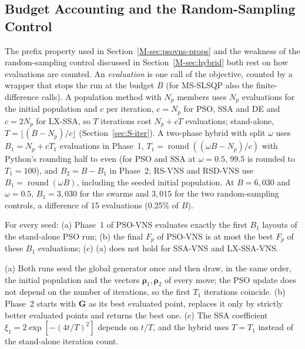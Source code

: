 \subsection{Budget Accounting and the Random-Sampling Control}
\label{sec:S-th-budget}
The prefix property used in Section~\ref{M-sec:psovns-props} and the weakness of the random-sampling control discussed in Section~\ref{M-sec:hybrid} both rest on how evaluations are counted. An \emph{evaluation} is one call of the objective, counted by a wrapper that stops the run at the budget $B$ (for MS-SLSQP also the finite-difference calls). A population method with $N_p$ members uses $N_p$ evaluations for the initial population and $c$ per iteration, $c=N_p$ for PSO, SSA and DE and $c=2N_p$ for LX-SSA, so $T$ iterations cost $N_p+cT$ evaluations; stand-alone, $T=\lfloor(B-N_p)/c\rfloor$ (Section~\ref{sec:S-iter}). A two-phase hybrid with split $\omega$ uses $B_1=N_p+cT_1$ evaluations in Phase~1, $T_1=\operatorname{round}((\omega B-N_p)/c)$ with Python's rounding half to even (for PSO and SSA at $\omega=0.5$, $99.5$ is rounded to $T_1=100$), and $B_2=B-B_1$ in Phase~2; RS-VNS and RSD-VNS use $B_1=\operatorname{round}(\omega B)$, including the seeded initial population. At $B=6{,}030$ and $\omega=0.5$, $B_1=3{,}030$ for the swarms and $3{,}015$ for the two random-sampling controls, a difference of 15 evaluations (0.25\% of $B$).

\begin{thS}
\label{prop:S-prefix}
For every seed: (a) Phase~1 of PSO-VNS evaluates exactly the first $B_1$ layouts of the stand-alone PSO run; (b) the final $F_p$ of PSO-VNS is at most the best $F_p$ of these $B_1$ evaluations; (c) (a) does not hold for SSA-VNS and LX-SSA-VNS.
\end{thS}
\begin{thSproof}
(a) Both runs seed the global generator once and then draw, in the same order, the initial population and the vectors $\boldsymbol\rho_1,\boldsymbol\rho_2$ of every move; the PSO update does not depend on the number of iterations, so the first $T_1$ iterations coincide. (b) Phase~2 starts with $\mathbf G$ as its best evaluated point, replaces it only by strictly better evaluated points and returns the best one. (c) The SSA coefficient $\xi_1=2\exp[-(4t/T)^2]$ depends on $t/T$, and the hybrid uses $T=T_1$ instead of the stand-alone iteration count.
\end{thSproof}

